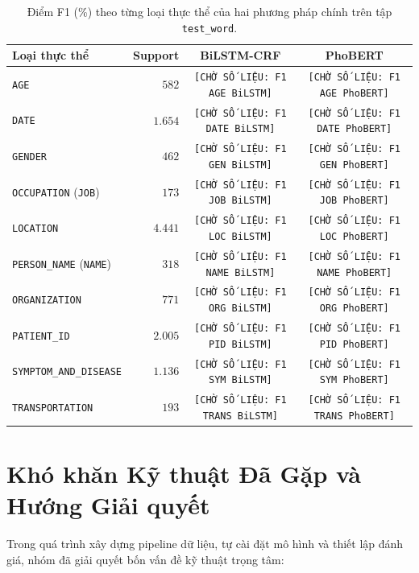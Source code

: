 \documentclass[11pt,a4paper,twocolumn]{article}
\begin{document}
\begin{table}[t]
\centering
\small
\begin{tabular}{lrcc}
\hline
\textbf{Loại thực thể} & \textbf{Support} & \textbf{BiLSTM-CRF} & \textbf{PhoBERT} \\
\hline
\texttt{AGE}                   & $582$   & \texttt{[CHỜ SỐ LIỆU: F1 AGE BiLSTM]}   & \texttt{[CHỜ SỐ LIỆU: F1 AGE PhoBERT]}   \\
\texttt{DATE}                  & $1.654$ & \texttt{[CHỜ SỐ LIỆU: F1 DATE BiLSTM]}  & \texttt{[CHỜ SỐ LIỆU: F1 DATE PhoBERT]}  \\
\texttt{GENDER}                & $462$   & \texttt{[CHỜ SỐ LIỆU: F1 GEN BiLSTM]}   & \texttt{[CHỜ SỐ LIỆU: F1 GEN PhoBERT]}   \\
\texttt{OCCUPATION} (\texttt{JOB}) & $173$ & \texttt{[CHỜ SỐ LIỆU: F1 JOB BiLSTM]} & \texttt{[CHỜ SỐ LIỆU: F1 JOB PhoBERT]}   \\
\texttt{LOCATION}              & $4.441$ & \texttt{[CHỜ SỐ LIỆU: F1 LOC BiLSTM]}   & \texttt{[CHỜ SỐ LIỆU: F1 LOC PhoBERT]}   \\
\texttt{PERSON\_NAME} (\texttt{NAME}) & $318$ & \texttt{[CHỜ SỐ LIỆU: F1 NAME BiLSTM]} & \texttt{[CHỜ SỐ LIỆU: F1 NAME PhoBERT]} \\
\texttt{ORGANIZATION}          & $771$   & \texttt{[CHỜ SỐ LIỆU: F1 ORG BiLSTM]}   & \texttt{[CHỜ SỐ LIỆU: F1 ORG PhoBERT]}   \\
\texttt{PATIENT\_ID}           & $2.005$ & \texttt{[CHỜ SỐ LIỆU: F1 PID BiLSTM]}   & \texttt{[CHỜ SỐ LIỆU: F1 PID PhoBERT]}   \\
\texttt{SYMPTOM\_AND\_DISEASE} & $1.136$ & \texttt{[CHỜ SỐ LIỆU: F1 SYM BiLSTM]}   & \texttt{[CHỜ SỐ LIỆU: F1 SYM PhoBERT]}   \\
\texttt{TRANSPORTATION}        & $193$   & \texttt{[CHỜ SỐ LIỆU: F1 TRANS BiLSTM]} & \texttt{[CHỜ SỐ LIỆU: F1 TRANS PhoBERT]} \\
\hline
\end{tabular}
\caption{Điểm F1 (\%) theo từng loại thực thể của hai phương pháp chính trên tập \texttt{test\_word}.}
\label{tab:ms_per_entity}
\end{table}

\section{Khó khăn Kỹ thuật Đã Gặp và Hướng Giải quyết}
Trong quá trình xây dựng pipeline dữ liệu, tự cài đặt mô hình và thiết lập đánh giá, nhóm đã giải quyết bốn vấn đề kỹ thuật trọng tâm:
\end{document}
